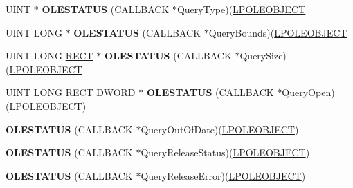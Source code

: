 \begin{DoxyCompactItemize}
U\+I\+NT $\ast$ {\bfseries O\+L\+E\+S\+T\+A\+T\+US} (C\+A\+L\+L\+B\+A\+CK $\ast$Query\+Type)(\hyperlink{struct___o_l_e_o_b_j_e_c_t}{L\+P\+O\+L\+E\+O\+B\+J\+E\+CT}
\item 
\mbox{\label{struct___o_l_e_o_b_j_e_c_t_v_t_b_l_a1363bf6be30734ef48e08ee362ea7206}} 
U\+I\+NT L\+O\+NG $\ast$ {\bfseries O\+L\+E\+S\+T\+A\+T\+US} (C\+A\+L\+L\+B\+A\+CK $\ast$Query\+Bounds)(\hyperlink{struct___o_l_e_o_b_j_e_c_t}{L\+P\+O\+L\+E\+O\+B\+J\+E\+CT}
\item 
\mbox{\label{struct___o_l_e_o_b_j_e_c_t_v_t_b_l_a170a8e029c3c8f472a73a5544173203a}} 
U\+I\+NT L\+O\+NG \hyperlink{structtag_r_e_c_t}{R\+E\+CT} $\ast$ {\bfseries O\+L\+E\+S\+T\+A\+T\+US} (C\+A\+L\+L\+B\+A\+CK $\ast$Query\+Size)(\hyperlink{struct___o_l_e_o_b_j_e_c_t}{L\+P\+O\+L\+E\+O\+B\+J\+E\+CT}
\item 
\mbox{\label{struct___o_l_e_o_b_j_e_c_t_v_t_b_l_a5dd41ad7010b9a2c3097bcd47a396920}} 
U\+I\+NT L\+O\+NG \hyperlink{structtag_r_e_c_t}{R\+E\+CT} D\+W\+O\+RD $\ast$ {\bfseries O\+L\+E\+S\+T\+A\+T\+US} (C\+A\+L\+L\+B\+A\+CK $\ast$Query\+Open)(\hyperlink{struct___o_l_e_o_b_j_e_c_t}{L\+P\+O\+L\+E\+O\+B\+J\+E\+CT})
\item 
\mbox{\label{struct___o_l_e_o_b_j_e_c_t_v_t_b_l_a6546751d8c1c23611c743d091c6e8673}} 
{\bfseries O\+L\+E\+S\+T\+A\+T\+US} (C\+A\+L\+L\+B\+A\+CK $\ast$Query\+Out\+Of\+Date)(\hyperlink{struct___o_l_e_o_b_j_e_c_t}{L\+P\+O\+L\+E\+O\+B\+J\+E\+CT})
\item 
\mbox{\label{struct___o_l_e_o_b_j_e_c_t_v_t_b_l_ad755032a373c7cee139a0ca751a18b80}} 
{\bfseries O\+L\+E\+S\+T\+A\+T\+US} (C\+A\+L\+L\+B\+A\+CK $\ast$Query\+Release\+Status)(\hyperlink{struct___o_l_e_o_b_j_e_c_t}{L\+P\+O\+L\+E\+O\+B\+J\+E\+CT})
\item 
\mbox{\label{struct___o_l_e_o_b_j_e_c_t_v_t_b_l_aa5aad43c5ee2004ecd4971270b594d35}} 
{\bfseries O\+L\+E\+S\+T\+A\+T\+US} (C\+A\+L\+L\+B\+A\+CK $\ast$Query\+Release\+Error)(\hyperlink{struct___o_l_e_o_b_j_e_c_t}{L\+P\+O\+L\+E\+O\+B\+J\+E\+CT})
\item 
\mbox{\label{struct___o_l_e_o_b_j_e_c_t_v_t_b_l_a359c0c871f748d31ad64b63f5198a43e}} 

\end{DoxyCompactItemize}
